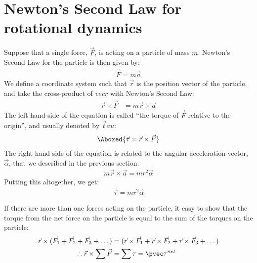 \section{Newton's Second Law for rotational dynamics}
Suppose that a single force, $\vec F$, is acting on a particle of mass $m$.  Newton's Second Law for the particle is then given by:
\begin{align*}
\vec F = m \vec a
\end{align*}
We define a coordinate system such that $\vec r$ is the position vector of the particle, and take the cross-product of $vec r$ with Newton's Second Law:
\begin{align*}
\vec r \times \vec F &= m \vec r \times \vec a
\end{align*}
The left hand-side of the equation is called ``the torque of $\vec F$ relative to the origin'', and usually denoted by $\vec tau$:
\begin{align}
\Aboxed{\vec \tau = \vec r \times \vec F}
\end{align}
The right-hand side of the equation is related to the angular acceleration vector, $\vec \alpha$, that we described in the previous section:
\begin{align*}
 m \vec r \times \vec a = mr^2\vec\alpha
\end{align*}
Putting this altogether, we get:
\begin{align*}
\vec\tau = mr^2 \vec\alpha
\end{align*}

If there are more than one forces acting on the particle, it easy to show that the torque from the net force on the particle is equal to the sum of the torques on the particle:
\begin{align*}
\vec r \times (\vec F_1 + \vec F_2 + \vec F_3 + \dots) &=  (\vec r \times \vec F_1 + \vec r \times \vec F_2 + \vec r \times \vec F_3 + \dots) \\
\therefore \vec r \times \sum \vec F &= \sum \tau = \pvec \tau^{net}
\end{align*}

